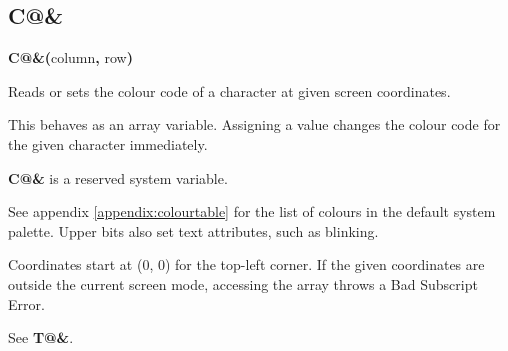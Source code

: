 \subsection{C@\&}
\begin{description}[leftmargin=2cm,style=nextline]
\item [Format:] {\bf C@\&(}column{\bf ,} row{\bf)}
\item [Usage:] Reads or sets the colour code of a character at given screen coordinates.

   This behaves as an array variable. Assigning a value changes the colour code for the given character immediately.

\item[Remarks:] {\bf C@\&} is a reserved system variable.

   See appendix \vref{appendix:colourtable} for the list of colours in the default system palette. Upper bits also set text attributes, such as blinking.

   Coordinates start at (0, 0) for the top-left corner. If the given coordinates are outside the current screen mode, accessing the array throws a Bad Subscript Error.

\item [Example:] See {\bf T@\&}.
\end{description}



\newpage
